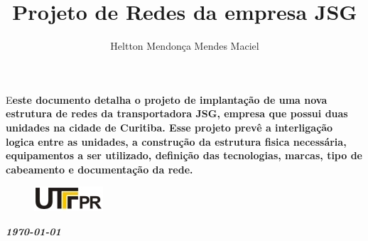 \documentclass[	DIV=calc,%
							paper=a4,%
							fontsize=12pt,%
							onecolumn]{scrartcl}	 					%
\title{ Projeto de Redes da empresa JSG}					%
\author{Heltton Mendonça Mendes Maciel }  	%
\date{}																				%
\newcommand{\initial}[1]{%
     \lettrine[lines=3,lhang=0.3,nindent=0em]{
     				\color{DarkGoldenrod}
     				{\textsf{#1}}}{}}
\begin{document}
\maketitle
\thispagestyle{fancy} 	
\thispagestyle{empty}		%




\initial{E}\textbf{este documento detalha o projeto de  implantação de uma nova estrutura de redes da transportadora JSG, empresa que possui duas unidades na cidade de Curitiba. 
Esse projeto prevê a interligação logica entre as unidades, a construção da estrutura fisica necessária, equipamentos a ser utilizado, definição das tecnologias, marcas, tipo de cabeamento e documentação da rede. }

\begin{figure}
	\centering
	\includegraphics{utfpr}
\end{figure}

\vspace{3cm}
\centerline{\textit{\textbf{\today}}}

\clearpage
    \renewcommand*\listfigurename{Lista de figuras}
\listoffigures

\renewcommand*\listtablename{Lista de tabelas}
\listoftables




\clearpage
\renewcommand{\contentsname}{Sumário}
\tableofcontents
\clearpage

\end{document}
